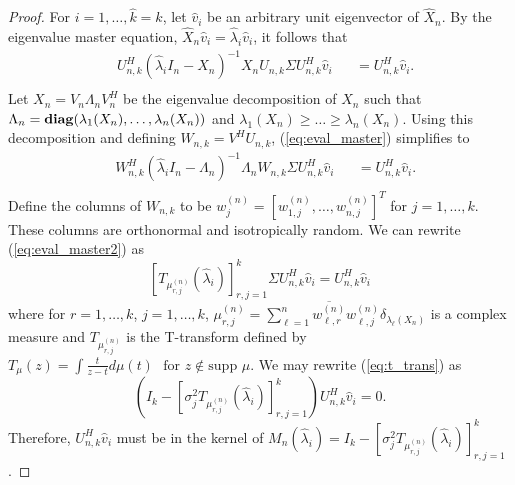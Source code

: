 \begin{proof}
For $i=1,\dots, \widehat{k}=k$, let $\widehat{v}_i$ be an arbitrary unit eigenvector of $\widehat{X}_n$. By the eigenvalue master equation, $\widehat{X}_n\widehat{v}_i=\widehat{\lambda}_i\widehat{v}_i$, it follows that
\begin{equation}\label{eq:eval_master}
\begin{aligned}
  &U_{n,k}^H\left(\widehat{\lambda}_iI_n-X_n\right)^{-1}X_nU_{n,k}\Sigma U_{n,k}^H\widehat{v}_i&&=U_{n,k}^H\widehat{v}_i.\\
\end{aligned}
\end{equation}
Let $X_n=V_n\Lambda_nV_n^H$ be the eigenvalue decomposition of $X_n$ such that $\Lambda_n=\mathop{\bf diag}(\lambda_1(X_n),\dots,\lambda_n(X_n))$ and $\lambda_1(X_n)\geq\dots\geq\lambda_n(X_n)$. Using this decomposition and defining $W_{n,k}=V^HU_{n,k}$, (\ref{eq:eval_master}) simplifies to
\begin{equation}\label{eq:eval_master2}
\begin{aligned}
  &W_{n,k}^H\left(\widehat{\lambda}_iI_n-\Lambda_n\right)^{-1}\Lambda_nW_{n,k}\Sigma U_{n,k}^H\widehat{v}_i&&=U_{n,k}^H\widehat{v}_i.\\
\end{aligned}
\end{equation}
Define the columns of $W_{n,k}$ to be $w_j^{(n)}=[w_{1,j}^{(n)},\dots,w_{n,j}^{(n)}]^T$ for $j=1,\dots,k$. These columns are orthonormal and isotropically random. We can rewrite (\ref{eq:eval_master2}) as
\begin{equation}\label{eq:t_trans}
\left[T_{\mu_{r,j}^{\left(n\right)}}\left(\widehat{\lambda}_i\right)\right]_{r,j=1}^k \Sigma U_{n,k}^H\widehat{v}_i=U_{n,k}^H\widehat{v}_i
\end{equation}
where for $r=1,\dots,k$, $j=1,\dots,k$, $\mu_{r,j}^{\left(n\right)}=\sum_{\ell=1}^n\overline{w_{\ell,r}^{\left(n\right)}}w_{\ell,j}^{\left(n\right)}\delta_{\lambda_\ell\left(X_n\right)}$ is a complex measure and $T_{\mu_{r,j}^{\left(n\right)}}$ is the T-transform defined by $T_{\mu}\left(z\right) = \int\frac{t}{z-t}d\mu\left(t\right)\,\,\,\,\text{for } z\not\in\text{supp } \mu$. We may rewrite (\ref{eq:t_trans}) as
\begin{equation*}
\left(I_k-\left[\sigma_j^2T_{\mu_{r,j}^{\left(n\right)}}\left(\widehat{\lambda}_i\right)\right]_{r,j=1}^k\right)U_{n,k}^H\widehat{v}_i=0.
\end{equation*}
Therefore, $U_{n,k}^H\widehat{v}_i$ must be in the kernel of $M_n\left(\widehat{\lambda}_i\right)=I_k-\left[\sigma_j^2T_{\mu_{r,j}^{\left(n\right)}}\left(\widehat{\lambda}_i\right)\right]_{r,j=1}^k$.

\end{proof}
